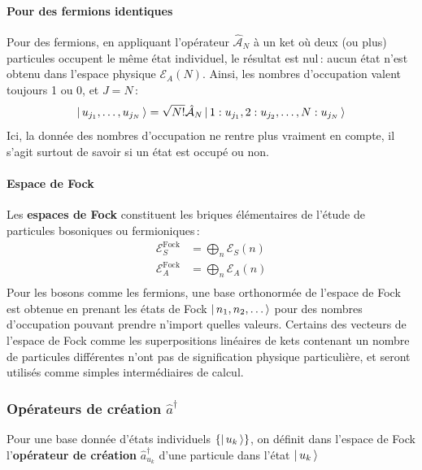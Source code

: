             \paragraph{Pour des fermions identiques}

            Pour des fermions, en appliquant l’opérateur $\hat{\mathcal{A}}_N$ à un ket où deux (ou plus) particules occupent le même état individuel, le résultat est nul : aucun état n’est obtenu dans l’espace physique $\mathcal{E}_A(N)$. Ainsi, les nombres d’occupation valent toujours 1 ou 0, et $J = N$ :
            \[ \left| \, u_{j_1}, \ldots, u_{j_N} \, \right> = \sqrt{N!} \hat{\mathcal{A}}_N \left| \, 1 : u_{j_1}, 2 : u_{j_2}, \ldots, N : u_{j_N} \, \right> \]
            Ici, la donnée des nombres d’occupation ne rentre plus vraiment en compte, il s’agit surtout de savoir si un état est occupé ou non.

            \paragraph{Espace de Fock}

            Les \textbf{espaces de Fock} constituent les briques élémentaires de l’étude de particules bosoniques ou fermioniques :
            \begin{align*}
                \mathcal{E}_S^{\text{Fock}} &= \bigoplus_{n} \mathcal{E}_S(n) \\
                \mathcal{E}_A^{\text{Fock}} &= \bigoplus_{n} \mathcal{E}_A(n) \\
            \end{align*}
            Pour les bosons comme les fermions, une base orthonormée de l’espace de Fock est obtenue en prenant les états de Fock $\left| \, n_1, n_2, \ldots \, \right>$ pour des nombres d’occupation pouvant prendre n’import quelles valeurs. Certains des vecteurs de l’espace de Fock comme les superpositions linéaires de kets contenant un nombre de particules différentes n’ont pas de signification physique particulière, et seront utilisés comme simples intermédiaires de calcul.

        \subsubsection{Opérateurs de création $\hat{a}^{\dagger}$}

        Pour une base donnée d’états individuels $\left\{\left| \, u_k \, \right>\right\}$, on définit dans l’espace de Fock l’\textbf{opérateur de création} $\hat{a}_{u_k}^{\dagger}$ d’une particule dans l’état $\left| \, u_k \, \right>$

